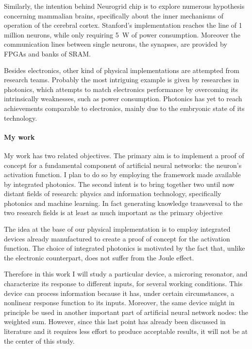 Similarly, the intention behind Neurogrid chip is to explore numerous hypothesis concerning mammalian brains, specifically about the inner mechanisms of operation of the cerebral cortex.
Stanford's implementation reaches the line of 1 million neurons, while only requiring \SI{5}{\W} of power consumption.
Moreover the communication lines between single neurons, the synapses, are provided by FPGAs and banks of SRAM.

Besides electronics, other kind of physical implementations are attempted from research teams.
Probably the most intriguing example is given by researches in photonics, which attempts to match electronics performance by overcoming its intrinsically weaknesses, such as power consumption.
Photonics has yet to reach achievements comparable to electronics, mainly due to the embryonic state of its technology.

\paragraph{My work\\}
My work has two related objectives.
The primary aim is to implement a proof of concept for a fundamental component of artificial neural networks: the neuron's activation function.
I plan to do so by employing the framework made available by integrated photonics.
The second intent is to bring together two until now distant fields of research: physics and information technology, specifically photonics and machine learning.
In fact generating knowledge transversal to the two research fields is at least as much important as the primary objective

The idea at the base of our physical implementation is to employ integrated devices already manufactured to create a proof of concept for the activation function.
The choice of integrated photonics is motivated by the fact that, unlike the electronic counterpart, does not suffer from the Joule effect.

Therefore in this work I will study a particular device, a microring resonator, and characterize its response to different inputs, for several working conditions.
This device can process information because it has, under certain circumstances, a nonlinear response function to its inputs.
Moreover, the same device might in principle be used in another important part of artificial neural network nodes: the weighted sum.
However, since this last point has already been discussed in literature and it requires less effort to produce acceptable results, it will not be at the center of this study.

